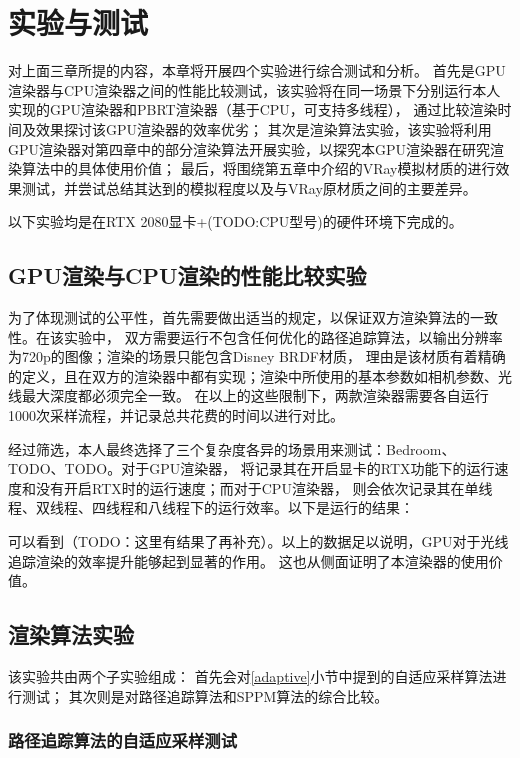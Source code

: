 \chapter{实验与测试}
\label{cha:evaluations}

对上面三章所提的内容，本章将开展四个实验进行综合测试和分析。
首先是GPU渲染器与CPU渲染器之间的性能比较测试，该实验将在同一场景下分别运行本人实现的GPU渲染器和PBRT渲染器（基于CPU，可支持多线程），
通过比较渲染时间及效果探讨该GPU渲染器的效率优劣；
其次是渲染算法实验，该实验将利用GPU渲染器对第四章中的部分渲染算法开展实验，以探究本GPU渲染器在研究渲染算法中的具体使用价值；
最后，将围绕第五章中介绍的VRay模拟材质的进行效果测试，并尝试总结其达到的模拟程度以及与VRay原材质之间的主要差异。

以下实验均是在RTX 2080显卡+(TODO:CPU型号)的硬件环境下完成的。

\section{GPU渲染与CPU渲染的性能比较实验}

为了体现测试的公平性，首先需要做出适当的规定，以保证双方渲染算法的一致性。在该实验中，
双方需要运行不包含任何优化的路径追踪算法，以输出分辨率为720p的图像；渲染的场景只能包含Disney BRDF材质，
理由是该材质有着精确的定义，且在双方的渲染器中都有实现；渲染中所使用的基本参数如相机参数、光线最大深度都必须完全一致。
在以上的这些限制下，两款渲染器需要各自运行1000次采样流程，并记录总共花费的时间以进行对比。

经过筛选，本人最终选择了三个复杂度各异的场景用来测试：Bedroom、TODO、TODO。对于GPU渲染器，
将记录其在开启显卡的RTX功能下的运行速度和没有开启RTX时的运行速度；而对于CPU渲染器，
则会依次记录其在单线程、双线程、四线程和八线程下的运行效率。以下是运行的结果：

可以看到（TODO：这里有结果了再补充）。以上的数据足以说明，GPU对于光线追踪渲染的效率提升能够起到显著的作用。
这也从侧面证明了本渲染器的使用价值。

\section{渲染算法实验}
该实验共由两个子实验组成：
首先会对\ref{adaptive}小节中提到的自适应采样算法进行测试；
其次则是对路径追踪算法和SPPM算法的综合比较。

\subsection{路径追踪算法的自适应采样测试}


